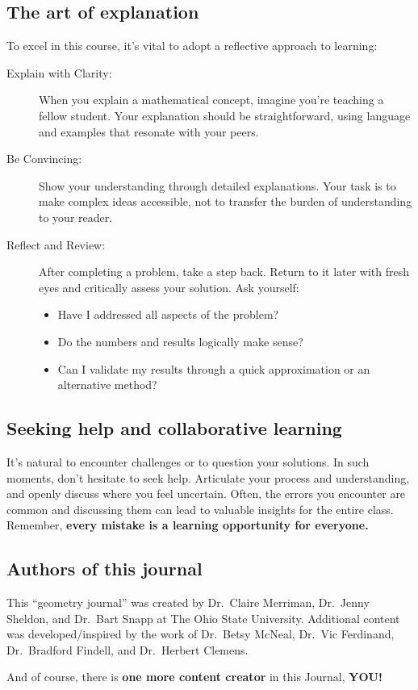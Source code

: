 \documentclass[handout,nooutcomes,noauthor]{ximera}
\begin{document}
\subsection*{The art of explanation}

To excel in this course, it's vital to adopt a reflective approach to
learning:
\begin{description}
\item[Explain with Clarity:] When you explain a mathematical concept, imagine you're teaching a fellow student. Your explanation should be straightforward, using language and examples that resonate with your peers.
\item[Be Convincing:] Show your understanding through detailed explanations. Your task is to make complex ideas accessible, not to transfer the burden of understanding to your reader.
\item[Reflect and Review:] After completing a problem, take a step back. Return to it later with fresh eyes and critically assess your solution. Ask yourself:
  \begin{itemize}
        \item Have I addressed all aspects of the problem?
        \item Do the numbers and results logically make sense?
        \item Can I validate my results through a quick approximation
          or an alternative method?
  \end{itemize}
\end{description}

\subsection*{Seeking help and collaborative learning}

It's natural to encounter challenges or to question your solutions. In
such moments, don't hesitate to seek help. Articulate your process and
understanding, and openly discuss where you feel uncertain. Often, the
errors you encounter are common and discussing them can lead to
valuable insights for the entire class. Remember, \textbf{every
  mistake is a learning opportunity for everyone.}





\subsection*{Authors of this journal}

This ``geometry journal'' was created by Dr.\ Claire Merriman,
Dr.\ Jenny Sheldon, and Dr.\ Bart Snapp at The Ohio State
University. Additional content was developed/inspired by the work of
Dr.\ Betsy McNeal, Dr.\ Vic Ferdinand, Dr.\ Bradford Findell, and
Dr.\ Herbert Clemens.


And of course, there is \textbf{one more
  content creator} in this Journal, \textbf{YOU!}
\end{document}
